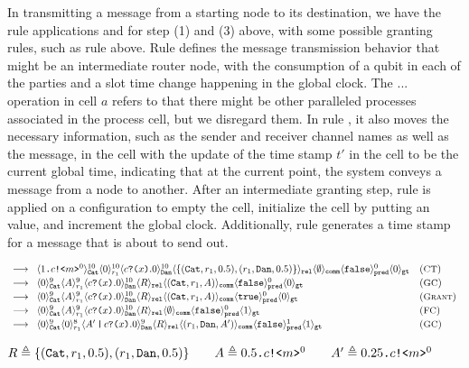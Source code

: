 In transmitting a message from a starting node to its destination,
we have the rule applications  and  for step (1) and (3) above, with some possible granting rules, such as rule  above.
Rule  defines the message transmission behavior that might be an intermediate router node, with the consumption of a qubit in each of the parties and a slot time change happening in the global clock.
The $...$ operation in cell $a$ refers to that there might 
be other paralleled processes associated in the process cell, but we disregard them.
In rule , it also moves the necessary information, such as the sender and receiver channel names as well as the message, in the  cell with the update of the time stamp $t'$ in the  cell to be the current global time,
indicating that at the current point, the system conveys a message from a node to another.
After an intermediate granting step, rule  is applied on a configuration to empty the  cell, initialize the  cell by putting an  value, and increment the global clock.
Additionally, rule  generates a time stamp for a message that is about to send out.

{\footnotesize
\[
\begin{array}{ll}
\longrightarrow\;\;
\langle 1\texttt{.}c\texttt{!<}m\texttt{>}^0 \rangle^{10}_{\texttt{Cat}}\langle 0 \rangle^{10}_{r_1}
\langle c\texttt{?(}x\texttt{)}.0 \rangle^{10}_{\texttt{Dan}} 
\langle \{(\texttt{Cat},r_1,0.5), (r_1,\texttt{Dan},0.5)\} \rangle_{\texttt{rel}}
\langle \emptyset \rangle_{\texttt{comm}}
\langle \texttt{false} \rangle^{0}_{\texttt{pred}}
\langle 0 \rangle_{\texttt{gt}}
&
({\small \textsc{CT}})
\\[0.2em]
\longrightarrow\;\;
\langle 0 \rangle^{9}_{\texttt{Cat}}\langle A \rangle^{9}_{r_1}
\langle c\texttt{?(}x\texttt{)}.0 \rangle^{10}_{\texttt{Dan}} 
\langle R \rangle_{\texttt{rel}}
\langle (\texttt{Cat},r_1,A) \rangle_{\texttt{comm}}
\langle \texttt{false} \rangle^{0}_{\texttt{pred}}
\langle 0 \rangle_{\texttt{gt}}
&
({\small \textsc{GC}})
\\[0.2em]
\longrightarrow\;\;
\langle 0 \rangle^{9}_{\texttt{Cat}}\langle A \rangle^{9}_{r_1}
\langle c\texttt{?(}x\texttt{)}.0 \rangle^{10}_{\texttt{Dan}} 
\langle R \rangle_{\texttt{rel}}
\langle (\texttt{Cat},r_1,A) \rangle_{\texttt{comm}}
\langle \texttt{true} \rangle^{0}_{\texttt{pred}}
\langle 0 \rangle_{\texttt{gt}}
&
({\small \textsc{Grant}})
\\[0.2em]
\longrightarrow\;\;
\langle 0 \rangle^{9}_{\texttt{Cat}}\langle A \rangle^{9}_{r_1}
\langle c\texttt{?(}x\texttt{)}.0 \rangle^{10}_{\texttt{Dan}} 
\langle R \rangle_{\texttt{rel}}
\langle \emptyset \rangle_{\texttt{comm}}
\langle \texttt{false} \rangle^{0}_{\texttt{pred}}
\langle 1 \rangle_{\texttt{gt}}
&
({\small \textsc{FC}})
\\[0.2em]
\longrightarrow\;\;
\langle 0 \rangle^{9}_{\texttt{Cat}}\langle 0 \rangle^{8}_{r_1}
\langle A'\,\texttt{|}\,c\texttt{?(}x\texttt{)}.0 \rangle^{9}_{\texttt{Dan}} 
\langle R \rangle_{\texttt{rel}}
\langle (r_1,\texttt{Dan},A') \rangle_{\texttt{comm}}
\langle \texttt{false} \rangle^{1}_{\texttt{pred}}
\langle 1 \rangle_{\texttt{gt}}
&
({\small \textsc{GC}})
\end{array}
\]
}
{\footnotesize
\begin{center}
$R\triangleq\{(\texttt{Cat},r_1,0.5), (r_1,\texttt{Dan},0.5)\}
\qquad
A\triangleq0.5\texttt{.}c\texttt{!<}m\texttt{>}^0
\qquad
A'\triangleq0.25\texttt{.}c\texttt{!<}m\texttt{>}^0$
\end{center}
}

